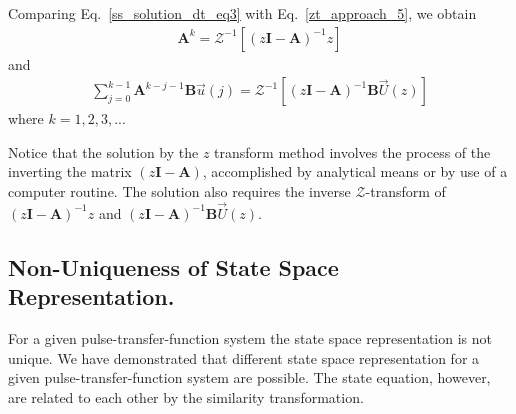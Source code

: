 \documentclass[11pt,a4paper,oneside]{book}
\numberwithin{equation}{section}
\theoremstyle{it}
\theoremstyle{definition}
\begin{document}
Comparing Eq.~\eqref{ss_solution_dt_eq3} with  Eq.~\eqref{zt_approach_5}, we 
obtain 
\begin{equation}\label{zt_approach_6}
	\begin{aligned}
		\mathbf{A}^k=\mathcal{Z}^{-1}\left[ \left( 
		z\mathbf{I}-\mathbf{A}\right)^{-1}z \right] 
	\end{aligned}
\end{equation}
and
\begin{equation}\label{zt_approach_7}
	\begin{aligned}
		\sum_{j=0}^{k-1}\mathbf{A}^{k-j-1}\mathbf{B}\vec{u}(j)=\mathcal{Z}^{-1}\left[
		\left( z\mathbf{I}-\mathbf{A}\right)^{-1}\mathbf{B}{\vec{U}}(z) 
		\right] 
	\end{aligned}
\end{equation}
where $k=1,2,3,...$

Notice that the solution by the $z$ transform method involves the process of 
the inverting the matrix $ \left( z\mathbf{I}-\mathbf{A}\right)$, accomplished 
by analytical means or by use of a computer routine. The solution also requires 
the inverse $\mathcal{Z}$-transform of $ \left( 
z\mathbf{I}-\mathbf{A}\right)^{-1}z$ and 
$\left( z\mathbf{I}-\mathbf{A}\right)^{-1}\mathbf{B}{\vec{U}}(z)$.


\subsection{Non-Uniqueness of State Space Representation.} For a given 
pulse-transfer-function system the state space representation is not unique. We 
have demonstrated that different state space representation for a given 
pulse-transfer-function system are possible. The state equation, however, are 
related to each other by the similarity transformation.
\end{document}
